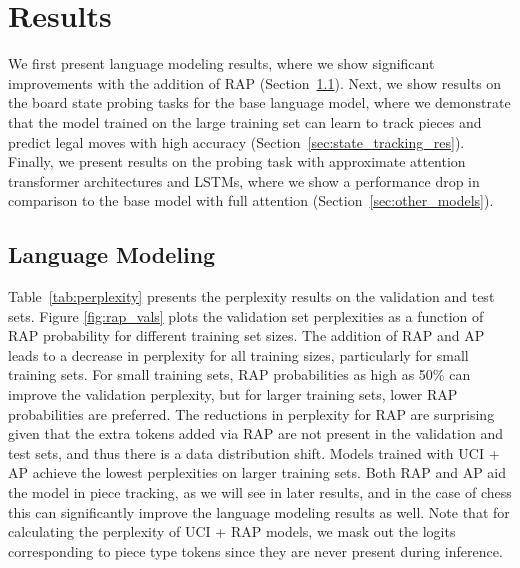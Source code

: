\documentclass[12pt]{thesis-umich}[thesis]
\newcommand{\piecetype}{AP\xspace}
\begin{document}
 \section{Results}
We first present language modeling results, where we show significant 
improvements with the addition of RAP (Section~\ref{sec:perplexity_res}). 
Next, we show results on the board state probing tasks for the base language model, where we demonstrate that the 
model trained on the large training set can learn to track pieces and predict legal moves with high accuracy (Section~\ref{sec:state_tracking_res}).
Finally, we present results on the probing task 
with approximate attention transformer architectures and LSTMs,  where we show a performance drop in comparison to the base model with full attention (Section~\ref{sec:other_models}).



\subsection{Language Modeling}
\label{sec:perplexity_res}
Table~\ref{tab:perplexity} presents the perplexity results on the validation and test sets.  
Figure \ref{fig:rap_vals} plots the validation set perplexities as a function of RAP probability for different training set sizes. 
The addition of RAP and \piecetype leads to a decrease in perplexity for all training sizes, particularly for small training sets.
For small training sets, RAP probabilities as high as 50\% can improve the validation perplexity, but for larger training sets, lower RAP probabilities are preferred. 
The reductions in perplexity for RAP are surprising given that the extra tokens added via RAP are not present in the validation and test sets, and thus there is a data distribution shift. Models trained with UCI + \piecetype achieve the lowest perplexities on larger training sets. 
Both RAP and \piecetype aid the model in piece tracking, as we will see in later results, and in the case of chess this can significantly improve the language modeling results as well.
Note that for calculating the perplexity of UCI + RAP models, we mask out the logits corresponding to piece type tokens since they are never present during inference. 
\end{document}
